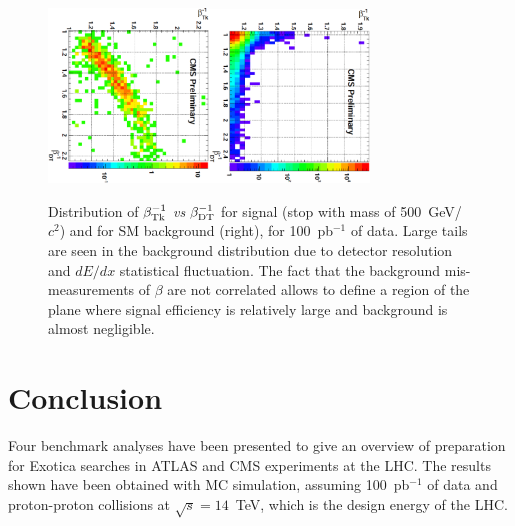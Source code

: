 \documentclass{cimento}
\begin{document}
\begin{figure}[htbp] 
\centering
\includegraphics[angle=90,width=0.38\textwidth]{betaHSCPSig.eps}\includegraphics[angle=90,width=0.38\textwidth]{betaHSCPBkg.eps}  
\caption{Distribution of $\beta_{{\rm Tk}}^{-1}$ {\it vs} $\beta_{{\rm DT}}^{-1}$  
for signal (stop with mass of 500~GeV/$c^2$) and for SM background (right), 
for 100~pb$^{-1}$ of data. Large tails are seen in the background distribution due 
to detector resolution and $dE/dx$ statistical fluctuation.
The fact that the background mis-measurements of $\beta$ are not correlated  
allows to define a region of the plane where signal efficiency is 
relatively large and background is almost negligible.}
\label{fig:HSCPSigBkgPlots}
\end{figure}

\section{Conclusion} \label{Conclusion}
Four benchmark analyses have been presented to give an
overview of preparation for Exotica searches in ATLAS and CMS 
experiments at the LHC. The results shown have been obtained with 
MC simulation, assuming 100~pb$^{-1}$ of data and proton-proton collisions
at $\sqrt{s} = 14$~TeV, which is the design energy of the LHC.
\end{document}
